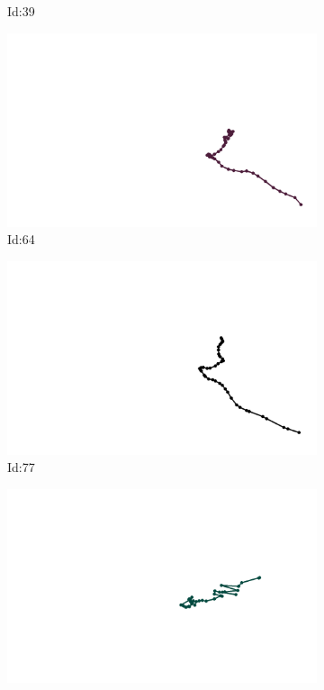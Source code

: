 \documentclass[12pt,twoside]{report}
\begin{document}
\begin{figure}
\begin{subfigure}[b]{0.20\textwidth}
\caption{Id:39}
\end{subfigure}
\begin{subfigure}[b]{0.20\textwidth}
\centering
\includegraphics[width=\textwidth]{../trajectories/64.png}
\caption{Id:64}
\end{subfigure}
\begin{subfigure}[b]{0.20\textwidth}
\centering
\includegraphics[width=\textwidth]{../trajectories/77.png}
\caption{Id:77}
\end{subfigure}
\begin{subfigure}[b]{0.20\textwidth}
\centering
\includegraphics[width=\textwidth]{../trajectories/87.png}

\end{subfigure}
\end{figure}
\end{document}
